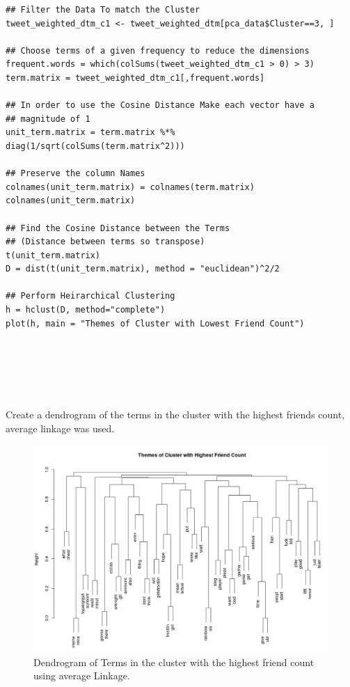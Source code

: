 \documentclass[11pt]{article}
\begin{document}
\begin{listing}[htbp]
\begin{verbatim}
## Filter the Data To match the Cluster
tweet_weighted_dtm_c1 <- tweet_weighted_dtm[pca_data$Cluster==3, ]

## Choose terms of a given frequency to reduce the dimensions
frequent.words = which(colSums(tweet_weighted_dtm_c1 > 0) > 3)
term.matrix = tweet_weighted_dtm_c1[,frequent.words]

## In order to use the Cosine Distance Make each vector have a
## magnitude of 1
unit_term.matrix = term.matrix %*% diag(1/sqrt(colSums(term.matrix^2)))

## Preserve the column Names
colnames(unit_term.matrix) = colnames(term.matrix)
colnames(unit_term.matrix)

## Find the Cosine Distance between the Terms
## (Distance between terms so transpose)
t(unit_term.matrix)
D = dist(t(unit_term.matrix), method = "euclidean")^2/2

## Perform Heirarchical Clustering
h = hclust(D, method="complete")
plot(h, main = "Themes of Cluster with Lowest Friend Count")






\end{verbatim}
\caption{\label{org1aa00c7}Create a dendrogram of the terms in the cluster with the highest friends count, average linkage was used.}
\end{listing}


\begin{figure}[htbp]
\centering
\includegraphics[width=12cm]{./Figures/HighDend.png}
\caption{\label{fig:org9b622d9}Dendrogram of Terms in the cluster with the highest friend count using average Linkage.}
\end{figure}
\end{document}
